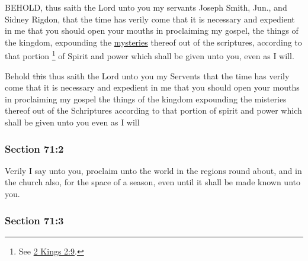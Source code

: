 		BEHOLD, thus saith the Lord unto you my servants Joseph Smith, Jun., and Sidney Rigdon, that the time has verily come that it is necessary and expedient in me that you should open your mouths in proclaiming my gospel, the things of the kingdom, expounding the \hyperref[MYSTERY]{mysteries} thereof out of the scriptures, according to that portion%
			\footnote{%
				See \hyperref[2KINGS-2-9]{2 Kings 2:9}.
				}
		of Spirit and power which shall be given unto you, even as I will.

		\begin{framed}
		\scriptsize
			\begin{compactdesc}
				\item[JSP] Behold \sout{this} thus saith the Lord unto you my Servents that the time has verily come that it is necessary and expedient in me that you should open your mouths in proclaiming my gospel the things of the kingdom expounding the misteries thereof out of the Schriptures according to that portion of spirit and power which shall be given unto you even as I will
			\end{compactdesc}
		\end{framed}

	\subsubsection{Section 71:2} %
		\label{DC71-2}

		Verily I say unto you, proclaim unto the world in the regions round about, and in the church also, for the space of a season, even until it shall be made known unto you.


	\subsubsection{Section 71:3} %
		\label{DC71-3}

